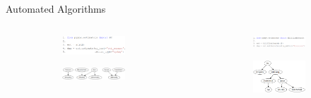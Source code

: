 \documentclass{beamer}
\begin{document}
\begin{frame}{Automated Algorithms}
	\begin{columns}
		\begin{column}[T]{0.5\textwidth}
			\begin{figure}
				\centering
				\begin{subfigure}{\textwidth}
					\includegraphics[scale=0.28]{imgs/pc_chisquare.png}
				\end{subfigure}
				\vspace{1em}
				\begin{subfigure}{\textwidth}
					\includegraphics[scale=0.25]{imgs/adult_x2.png}
				\end{subfigure}
			\end{figure}
		\end{column}
		\vrule
		\begin{column}[T]{0.5\textwidth}
			\begin{figure}
				\centering
				\begin{subfigure}{\textwidth}
					\includegraphics[scale=0.25]{imgs/hill_bic.png}
				\end{subfigure}
				\begin{subfigure}{\textwidth}
					\includegraphics[scale=0.25]{imgs/adult_bic.png}

\end{subfigure}
\end{figure}
\end{column}
\end{columns}
\end{frame}
\end{document}
